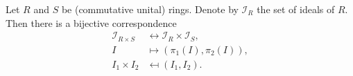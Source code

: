 Let $R$ and $S$ be (commutative unital) rings. Denote by $\mathcal{I}_R$ the
set of ideals of $R$. Then there is a bijective correspondence
\begin{align*}
	\mathcal{I}_{R \times S} &\leftrightarrow \mathcal{I}_R \times \mathcal{I}_S,\\
	I &\mapsto (\pi_1(I), \pi_2(I)),\\
	I_1\times I_2 &\mapsfrom (I_1, I_2).
\end{align*}
